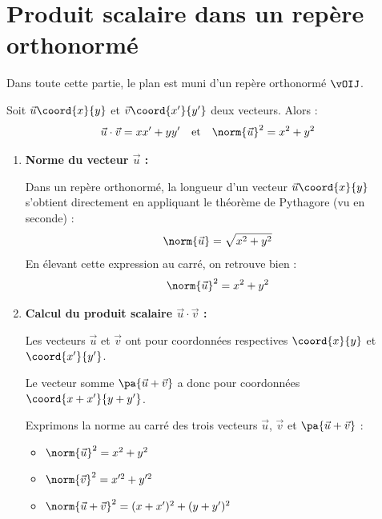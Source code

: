 \section{Produit scalaire dans un repère orthonormé}

Dans toute cette partie, le plan est muni d'un repère orthonormé $\vOIJ$.

\begin{prop}
	Soit $\vec{u}\coord{x}{y}$ et $\vec{v}\coord{x'}{y'}$ deux vecteurs. Alors :
	\[
		\vec{u}\cdot\vec{v} = xx' + yy' \quad\text{et}\quad \norm{\vec{u}}^2 = x^2 + y^2
	\]

\end{prop}

\begin{demo}
	\nline
	\begin{enumerate}
		\item \textbf{Norme du vecteur $\vec{u}$ :}

		      Dans un repère orthonormé, la longueur d'un vecteur $\vec{u}\coord{x}{y}$ s'obtient directement en appliquant le théorème de Pythagore (vu en seconde) :
		      \[
			      \norm{\vec{u}} = \sqrt{x^2 + y^2}
		      \]
		      En élevant cette expression au carré, on retrouve bien :
		      \[
			      \norm{\vec{u}}^2 = x^2 + y^2
		      \]

		\item \textbf{Calcul du produit scalaire $\vec{u}\cdot\vec{v}$ :}

		      Les vecteurs $\vec{u}$ et $\vec{v}$ ont pour coordonnées respectives $\coord{x}{y}$ et $\coord{x'}{y'}$.

		      Le vecteur somme $\pa{\vec{u} + \vec{v}}$ a donc pour coordonnées $\coord{x + x'}{y + y'}$.

		      Exprimons la norme au carré des trois vecteurs $\vec{u}$, $\vec{v}$ et $\pa{\vec{u} + \vec{v}}$ :
		      \begin{itemize}
			      \item $\norm{\vec{u}}^2 = x^2 + y^2$
			      \item $\norm{\vec{v}}^2 = x'^2 + y'^2$
			      \item $\norm{\vec{u} + \vec{v}}^2 = (x + x')^2 + (y + y')^2$
		      \end{itemize}


\end{enumerate}
\end{demo}
